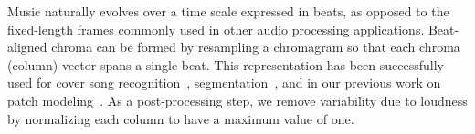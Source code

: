 \documentclass{article}
\begin{document}
Music naturally evolves over a time scale expressed in beats, as
opposed to the fixed-length frames commonly used in other audio
processing applications.  Beat-aligned chroma can be formed by
resampling a chromagram so that each chroma (column) vector spans a
single beat.  This representation has been successfully used for cover
song recognition~\cite{Ellis2007a}, segmentation~\cite{Weiss2010}, and
in our previous work on patch modeling~\cite{Bertin-Mahieux2010a}.  As
a post-processing step, we remove variability due to loudness by
normalizing each column to have a maximum value of one.




\end{document}
